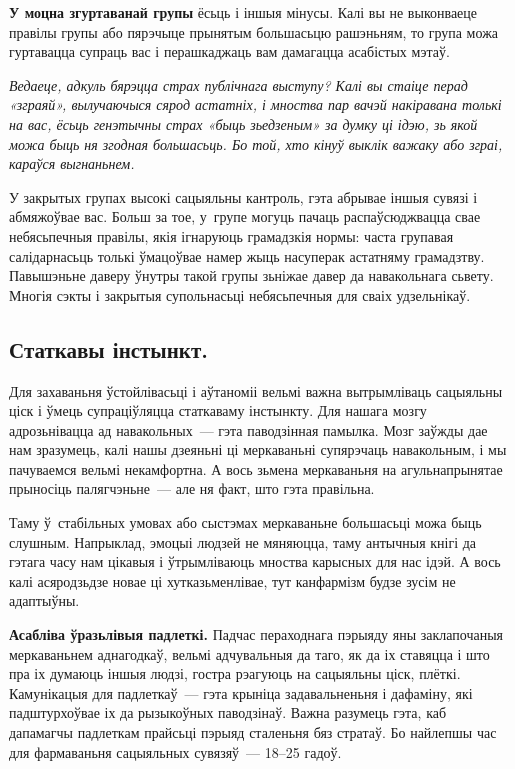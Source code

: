 \textbf{У моцна згуртаванай групы} ёсьць і іншыя мінусы. Калі вы не выконваеце правілы групы або пярэчыце прынятым большасьцю рашэньням, то група можа гуртавацца супраць вас і перашкаджаць вам дамагацца асабістых мэтаў.

\emph{Ведаеце, адкуль бярэцца страх публічнага выступу? Калі вы стаіце перад «зграяй», вылучаючыся сярод астатніх, і мноства пар вачэй накіравана толькі на вас, ёсьць генэтычны страх «быць зьедзеным» за думку ці ідэю, зь якой можа быць ня згодная большасьць. Бо той, хто кінуў выклік важаку або зграі, караўся выгнаньнем.}

У закрытых групах высокі сацыяльны кантроль, гэта абрывае іншыя сувязі і абмяжоўвае вас. Больш за тое, у~групе могуць пачаць распаўсюджвацца свае небясьпечныя правілы, якія ігнаруюць грамадзкія нормы: часта групавая салідарнасьць толькі ўмацоўвае намер жыць насуперак астатняму грамадзтву. Павышэньне даверу ўнутры такой групы зьніжае давер да навакольнага сьвету. Многія сэкты і закрытыя супольнасьці небясьпечныя для сваіх удзельнікаў.

\subsection*{Статкавы інстынкт.}

Для захаваньня ўстойлівасьці і аўтаноміі вельмі важна вытрымліваць сацыяльны ціск і ўмець супраціўляцца статкаваму інстынкту. Для нашага мозгу адрозьнівацца ад навакольных~--- гэта паводзінная памылка. Мозг заўжды дае нам зразумець, калі нашы дзеяньні ці меркаваньні супярэчаць навакольным, і мы пачуваемся вельмі некамфортна. А вось зьмена меркаваньня на агульнапрынятае прыносіць палягчэньне~--- але ня факт, што гэта правільна.


Таму ў~стабільных умовах або сыстэмах меркаваньне большасьці можа быць слушным. Напрыклад, эмоцыі людзей не мяняюцца, таму антычныя кнігі да гэтага часу нам цікавыя і ўтрымліваюць мноства карысных для нас ідэй. А вось калі асяродзьдзе новае ці хутказьменлівае, тут канфармізм будзе зусім не адаптыўны.

\textbf{Асабліва ўразьлівыя падлеткі.} Падчас пераходнага пэрыяду яны заклапочаныя меркаваньнем аднагодкаў, вельмі адчувальныя да таго, як да іх ставяцца і што пра іх думаюць іншыя людзі, гостра рэагуюць на сацыяльны ціск, плёткі. Камунікацыя для падлеткаў~--- гэта крыніца задавальненьня і дафаміну, які падштурхоўвае іх да рызыкоўных паводзінаў. Важна разумець гэта, каб дапамагчы падлеткам прайсьці пэрыяд сталеньня бяз стратаў. Бо найлепшы час для фармаваньня сацыяльных сувязяў~--- 18--25 гадоў.

